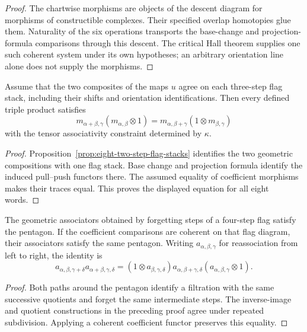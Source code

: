 \begin{proof}
The chartwise morphisms are objects of the descent diagram for
morphisms of constructible complexes. Their specified overlap
homotopies glue them. Naturality of the six operations transports
the base-change and projection-formula comparisons through this
descent. The critical Hall theorem supplies one such coherent
system under its own hypotheses; an arbitrary orientation line
alone does not supply the morphisms.
\end{proof}

\begin{proposition}
\label{prop:lll-associativity}
\label{prop:llw-associativity}
\label{prop:lwl-associativity}
\label{prop:wll-associativity}
\label{prop:lww-associativity}
\label{prop:wlw-associativity}
\label{prop:wwl-associativity}
\label{prop:www-associativity}
Assume that the two composites of the maps $u$ agree on each
three-step flag stack, including their shifts and orientation
identifications. Then every defined triple product satisfies
\[
 m_{\alpha+\beta,\gamma}(m_{\alpha,\beta}\otimes1)
 =m_{\alpha,\beta+\gamma}(1\otimes m_{\beta,\gamma})
\]
with the tensor associativity constraint determined by $\kappa$.
\end{proposition}

\begin{proof}
Proposition~\ref{prop:eight-two-step-flag-stacks} identifies the
two geometric compositions with one flag stack. Base change and
projection formula identify the induced pull--push functors there.
The assumed equality of coefficient morphisms makes their traces
equal. This proves the displayed equation for all eight words.
\end{proof}

\begin{proposition}
\label{prop:four-input-pentagon-coherence}
The geometric associators obtained by forgetting steps of a
four-step flag satisfy the pentagon. If the coefficient
comparisons are coherent on that flag diagram, their associators
satisfy the same pentagon.
Writing $a_{\alpha,\beta,\gamma}$ for reassociation from left
to right, the identity is
\[
 a_{\alpha,\beta,\gamma+\delta}
 a_{\alpha+\beta,\gamma,\delta}
 =(1\otimes a_{\beta,\gamma,\delta})
   a_{\alpha,\beta+\gamma,\delta}
   (a_{\alpha,\beta,\gamma}\otimes1).
\]
\end{proposition}

\begin{proof}
Both paths around the pentagon identify a filtration with the
same successive quotients and forget the same intermediate steps.
The inverse-image and quotient constructions in the preceding
proof agree under repeated subdivision. Applying a coherent
coefficient functor preserves this equality.
\end{proof}

